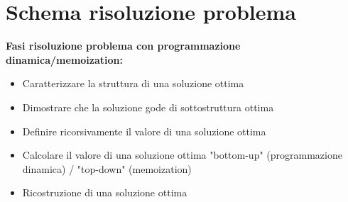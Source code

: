 \documentclass[../cheatSheetAlgoritmi.tex]{subfiles}
\begin{document}
\section{Schema risoluzione problema}
\textbf{Fasi risoluzione problema con programmazione dinamica/memoization:}\
\begin{itemize}
	\item Caratterizzare la struttura di una soluzione ottima
	\item Dimostrare che la soluzione gode di sottostruttura ottima
	\item Definire ricorsivamente il valore di una soluzione ottima
	\item Calcolare il valore di una soluzione ottima "bottom-up" (programmazione dinamica) / "top-down" (memoization)
	\item Ricostruzione di una soluzione ottima
\end{itemize}
\newpage
\end{document}
